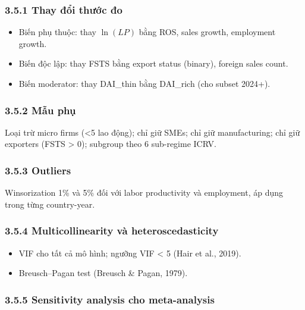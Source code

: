 \documentclass[12pt,a4paper]{article}
\providecommand{\tightlist}{\setlength{\itemsep}{0pt}\setlength{\parskip}{0pt}}
\begin{document}
\hypertarget{351-thay-ux111ux1ed5i-thux1b0ux1edbc-ux111o}{%
\subsubsection{3.5.1 Thay đổi thước
đo}\label{351-thay-ux111ux1ed5i-thux1b0ux1edbc-ux111o}}

\begin{itemize}
\tightlist
\item
  Biến phụ thuộc: thay \(\ln(LP)\) bằng ROS, sales growth, employment
  growth.
\item
  Biến độc lập: thay FSTS bằng export status (binary), foreign sales
  count.
\item
  Biến moderator: thay DAI\_thin bằng DAI\_rich (cho subset 2024+).
\end{itemize}

\hypertarget{352-mux1eabu-phux1ee5}{%
\subsubsection{3.5.2 Mẫu phụ}\label{352-mux1eabu-phux1ee5}}

Loại trừ micro firms (\textless5 lao động); chỉ giữ SMEs; chỉ giữ
manufacturing; chỉ giữ exporters (FSTS \textgreater{} 0); subgroup theo
6 sub-regime ICRV.

\hypertarget{353-outliers}{%
\subsubsection{3.5.3 Outliers}\label{353-outliers}}

Winsorization 1\% và 5\% đối với labor productivity và employment, áp
dụng trong từng country-year.

\hypertarget{354-multicollinearity-vuxe0-heteroscedasticity}{%
\subsubsection{3.5.4 Multicollinearity và
heteroscedasticity}\label{354-multicollinearity-vuxe0-heteroscedasticity}}

\begin{itemize}
\tightlist
\item
  VIF cho tất cả mô hình; ngưỡng VIF \textless{} 5 (Hair et al., 2019).
\item
  Breusch--Pagan test (Breusch \& Pagan, 1979).
\end{itemize}

\hypertarget{355-sensitivity-analysis-cho-meta-analysis}{%
\subsubsection{3.5.5 Sensitivity analysis cho
meta-analysis}\label{355-sensitivity-analysis-cho-meta-analysis}}
\end{document}
